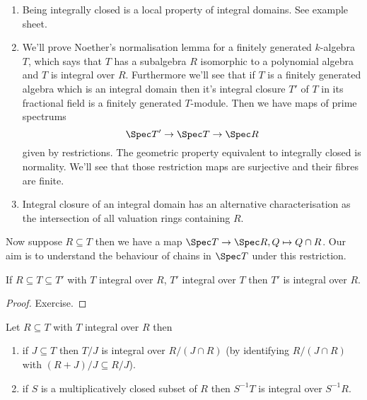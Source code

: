 \documentclass[a4paper]{article}
\begin{document}
\begin{remark}\leavevmode
  \begin{enumerate}
  \item Being integrally closed is a local property of integral domains. See example sheet.
  \item We'll prove Noether's normalisation lemma for a finitely generated \(k\)-algebra \(T\), which says that \(T\) has a subalgebra \(R\) isomorphic to a polynomial algebra and \(T\) is integral over \(R\). Furthermore we'll see that if \(T\) is a finitely generated algebra which is an integral domain then it's integral closure \(T'\) of \(T\) in its fractional field is a finitely generated \(T\)-module. Then we have maps of prime spectrums
    \[
      \Spec T' \to \Spec T \to \Spec R
    \]
    given by restrictions. The geometric property equivalent to integrally closed is normality. We'll see that those restriction maps are surjective and their fibres are finite.
  \item Integral closure of an integral domain has an alternative characterisation as the intersection of all valuation rings containing \(R\).
  \end{enumerate}
\end{remark}

Now suppose \(R \subseteq T\) then we have a map \(\Spec T \to \Spec R, Q \mapsto Q \cap R\). Our aim is to understand the behaviour of chains in \(\Spec T\) under this restriction.

\begin{lemma}
  If \(R \subseteq T \subseteq T'\) with \(T\) integral over \(R\), \(T'\) integral over \(T\) then \(T'\) is integral over \(R\).
\end{lemma}

\begin{proof}
  Exercise.
\end{proof}

\begin{lemma}
  Let \(R \subseteq T\) with \(T\) integral over \(R\) then
  \begin{enumerate}
  \item if \(J \subseteq T\) then \(T/J\) is integral over \(R/(J \cap R)\) (by identifying \(R/(J \cap R)\) with \((R + J)/J \subseteq R/J\)).
  \item if \(S\) is a multiplicatively closed subset of \(R\) then \(S^{-1}T\) is integral over \(S^{-1}R\).
  \end{enumerate}
\end{lemma}
\end{document}
